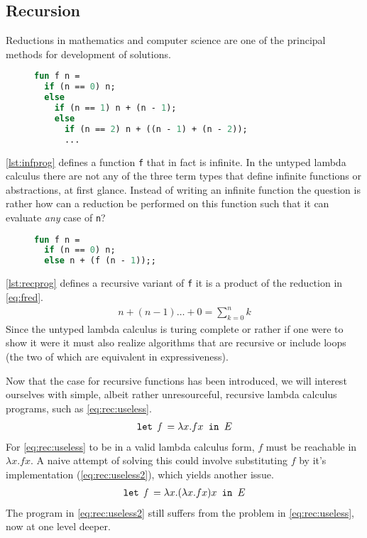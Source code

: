 \subsection{Recursion}
\label{sec:lamrec}
\noindent Reductions in mathematics and computer science are one of the principal methods for development of solutions.
\begin{figure}
\begin{lstlisting}[language=ML,caption={Infinite program},label={lst:infprog}]
fun f n = 
  if (n == 0) n;
  else 
    if (n == 1) n + (n - 1);
    else 
      if (n == 2) n + ((n - 1) + (n - 2));
      ...
\end{lstlisting}
\end{figure}
\autoref{lst:infprog} defines a function \texttt{f} that in fact is infinite.
In the untyped lambda calculus there are not any of the three term types that define infinite functions or abstractions, at first glance.
Instead of writing an infinite function the question is rather how can a reduction be performed on this function such that it can evaluate \textit{any} case of \texttt{n}?
\begin{figure}
\begin{lstlisting}[language=ML,caption={Recursive program},label={lst:recprog}]
fun f n = 
  if (n == 0) n;
  else n + (f (n - 1));;
\end{lstlisting}
\end{figure}
\autoref{lst:recprog} defines a recursive variant of \texttt{f} it is a product of the reduction in \autoref{eq:fred}.
\begin{align}
    n + (n - 1) \dots + 0 = \sum_{k = 0}^n k
    \label{eq:fred}
\end{align}
Since the untyped lambda calculus is turing complete or rather if one were to show it were it must also realize algorithms that are recursive or include loops (the two of which are equivalent in expressiveness).

Now that the case for recursive functions has been introduced, we will interest ourselves with simple, albeit rather unresourceful, recursive lambda calculus programs, such as \autoref{eq:rec:useless}.
\begin{align}
  \texttt{let } \textit{f } = \lambda x. f x \texttt{ in } E\label{eq:rec:useless}
\end{align}
For \autoref{eq:rec:useless} to be in a valid lambda calculus form, $f$ must be reachable in $\lambda x.fx$.
A naive attempt of solving this could involve substituting $f$ by it's implementation (\autoref{eq:rec:useless2}), which yields another issue.
\begin{align}
  \texttt{let } \textit{f } = \lambda x. (\lambda x. fx) x \texttt{ in } E\label{eq:rec:useless2}
\end{align}
The program in \autoref{eq:rec:useless2} still suffers from the problem in \autoref{eq:rec:useless}, now at one level deeper.

